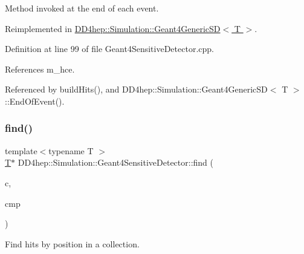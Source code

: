 Method invoked at the end of each event. 

Reimplemented in \hyperlink{class_d_d4hep_1_1_simulation_1_1_geant4_generic_s_d_a07009f3334d1f7125c128cc59fc20e6e}{D\+D4hep\+::\+Simulation\+::\+Geant4\+Generic\+S\+D$<$ T $>$}.



Definition at line 99 of file Geant4\+Sensitive\+Detector.\+cpp.



References m\+\_\+hce.



Referenced by build\+Hits(), and D\+D4hep\+::\+Simulation\+::\+Geant4\+Generic\+S\+D$<$ T $>$\+::\+End\+Of\+Event().

\hypertarget{class_d_d4hep_1_1_simulation_1_1_geant4_sensitive_detector_a6c8e0611bafa6aab392e12ae55d14ad0}{}\label{class_d_d4hep_1_1_simulation_1_1_geant4_sensitive_detector_a6c8e0611bafa6aab392e12ae55d14ad0} 
\subsubsection{\texorpdfstring{find()}{find()}\hspace{0.1cm}{\footnotesize\ttfamily [1/2]}}
{\footnotesize\ttfamily template$<$typename T $>$ \\
\hyperlink{class_t}{T}$\ast$ D\+D4hep\+::\+Simulation\+::\+Geant4\+Sensitive\+Detector\+::find (\begin{DoxyParamCaption}\item[{const \hyperlink{class_d_d4hep_1_1_simulation_1_1_geant4_sensitive_detector_a4865cf9c96edfef8cd41e309a4cd6211}{Hit\+Collection} $\ast$}]{c,  }\item[{const \hyperlink{class_d_d4hep_1_1_simulation_1_1_hit_compare}{Hit\+Compare}$<$ \hyperlink{class_t}{T} $>$ \&}]{cmp }\end{DoxyParamCaption})\hspace{0.3cm}{\ttfamily [protected]}}



Find hits by position in a collection. 

\hypertarget{class_d_d4hep_1_1_simulation_1_1_geant4_sensitive_detector_a8908101354409b3b4eb073222fd7bbee}{}\label{class_d_d4hep_1_1_simulation_1_1_geant4_sensitive_detector_a8908101354409b3b4eb073222fd7bbee} 
